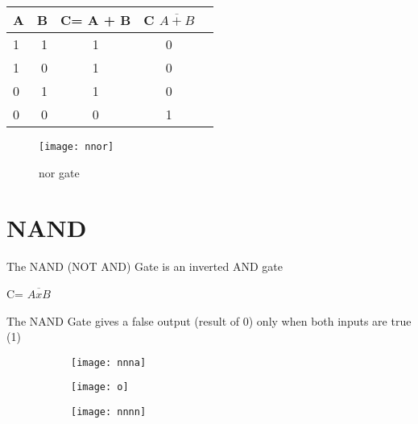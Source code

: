 \documentclass{article}
\begin{document}
\begin{table}[h!]
	\begin{center}
		\begin{tabular}{|l|r|c|c|c|}
			\cellcolor{blue!35}\textbf{A} & \cellcolor{blue!35}\textbf{B} & \cellcolor{blue!35}\textbf{C= A + B} & \cellcolor{blue!35}\textbf{C $\overline{A+B}$}\\
			\hline
			\cellcolor{blue!15}	1 & \cellcolor{blue!15}1 & \cellcolor{blue!15}1 & \cellcolor{blue!15}0\\
			\cellcolor{blue!15}	1 & \cellcolor{blue!15} 0 & \cellcolor{blue!15}1 & \cellcolor{blue!15}0\\
			\cellcolor{blue!15}	0 & \cellcolor{blue!15}1 & \cellcolor{blue!15} 1 & 	\cellcolor{blue!15}0\\
			\cellcolor{blue!15}	0 & \cellcolor{blue!15}0 & \cellcolor{blue!15}0 & 	\cellcolor{blue!15}1\\
			\hline	
		\end{tabular}
	\end{center}
\end{table}

\begin{figure}[h!]
\texttt{[image: nnor]}
\caption{nor gate}
\end{figure}
\section{NAND}
The NAND (NOT AND) Gate is an inverted AND gate
\begin{center}
	C= $\overline{AxB}$
\end{center}
The NAND Gate gives a false output (result of 0) only when both inputs are true (1)

\begin{figure}[h!]
	\centering
	\begin{subfigure}[h!]{0.2\linewidth}
		
		\texttt{[image: nnna]} \end{subfigure}
	\begin{subfigure}[h!]{0.08\linewidth}
		\texttt{[image: o]}
	\end{subfigure}
	\begin{subfigure}[h!]{0.2\linewidth}
		\texttt{[image: nnnn]}
	\end{subfigure}
\end{figure}
\end{document}
